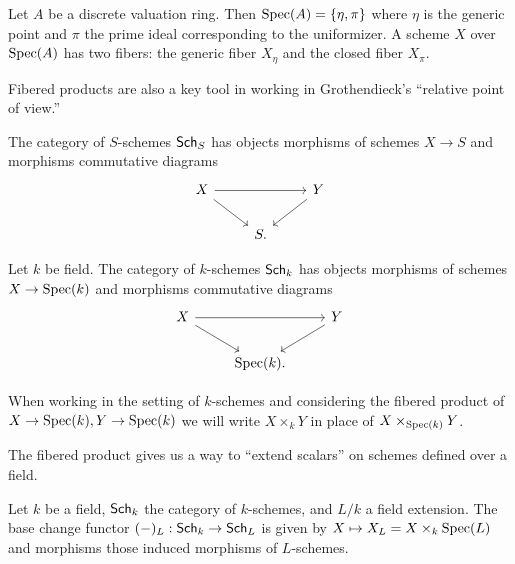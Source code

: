 \begin{example}
    Let $A$ be a discrete valuation ring. Then $\operatorname{Spec}(A)=\{\eta,\pi\}$ where $\eta$ is the generic point and $\pi$ the prime ideal corresponding to the uniformizer. A scheme $X$ over $\operatorname{Spec}(A)$ has two fibers: the generic fiber $X_{\eta}$ and the closed fiber $X_{\pi}$. 
\end{example}
Fibered products are also a key tool in working in Grothendieck's ``relative point of view.''
\begin{definition}\label{def: category of S-schemes}
    The category of $S$-schemes $\mathsf{Sch}_{S}$ has objects morphisms of schemes $X\to S$ and morphisms commutative diagrams 
    $$%
    \begin{tikzcd}
        X && Y \\
        & S.
        \arrow[from=1-1, to=1-3]
        \arrow[from=1-1, to=2-2]
        \arrow[from=1-3, to=2-2]
    \end{tikzcd}$$
\end{definition}
\begin{definition}\label{def: category of k-schemes}
    Let $k$ be field. The category of $k$-schemes $\mathsf{Sch}_{k}$ has objects morphisms of schemes $X\to \operatorname{Spec}(k)$ and morphisms commutative diagrams 
    $$%
    \begin{tikzcd}
        X && Y \\
        & {\spec(k).}
        \arrow[from=1-1, to=1-3]
        \arrow[from=1-1, to=2-2]
        \arrow[from=1-3, to=2-2]
    \end{tikzcd}$$
\end{definition}
\begin{remark}
    When working in the setting of $k$-schemes and considering the fibered product of $X\to\operatorname{Spec}(k),Y\to\operatorname{Spec}(k)$ we will write $X\times_{k}Y$ in place of $X\times_{\operatorname{Spec}(k)}Y$. 
\end{remark}
The fibered product gives us a way to ``extend scalars'' on schemes defined over a field. 
\begin{definition}\label{def: base change}
    Let $k$ be a field, $\mathsf{Sch}_{k}$ the category of $k$-schemes, and $L/k$ a field extension. The base change functor $(-)_{L}:\mathsf{Sch}_{k}\to\mathsf{Sch}_{L}$ is given by $X\mapsto X_{L}=X\times_{k}\operatorname{Spec}(L)$ and morphisms those induced morphisms of $L$-schemes. 
\end{definition}
